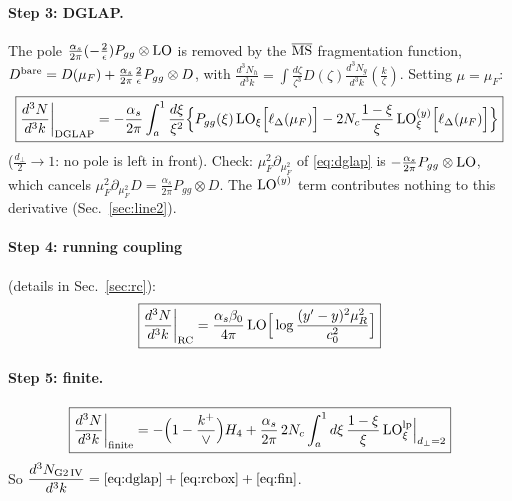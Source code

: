 \documentclass[10pt]{article}
\numberwithin{equation}{section}
\newcommand{\LO}{{\rm LO}}
\newcommand{\MSb}{\overline{\rm MS}}
\begin{document}
\paragraph{Step 3: DGLAP.} The pole $\frac{\alpha_s}{2\pi}(-\frac2\epsilon)P_{gg}\otimes\LO$ is removed by the $\MSb$ fragmentation function, $D^{\rm bare}=D(\mu_F)+\frac{\alpha_s}{2\pi}\frac2\epsilon P_{gg}\otimes D$, with $\frac{d^3N_h}{d^3k}=\int\frac{d\zeta}{\zeta^3}D(\zeta)\frac{d^3N_g}{d^3k}(\frac{k}{\zeta})$. Setting $\mu=\mu_F$:
\begin{equation}
\boxed{\frac{d^3N}{d^3k}\bigg|_{\rm DGLAP}=-\frac{\alpha_s}{2\pi}\int_a^1\frac{d\xi}{\xi^2}\Big\{P_{gg}(\xi)\,\LO_\xi\Big[\ell_\Delta(\mu_F)\Big]-2N_c\frac{1-\xi}{\xi}\,\LO^{(y)}_\xi\Big[\ell_\Delta(\mu_F)\Big]\Big\}}\label{eq:dglap}
\end{equation}
($\frac{d_\perp}{2}\to1$: no pole is left in front). Check: $\mu_F^2\partial_{\mu_F^2}$ of \eqref{eq:dglap} is $-\frac{\alpha_s}{2\pi}P_{gg}\otimes\LO$, which cancels $\mu_F^2\partial_{\mu_F^2}D=\frac{\alpha_s}{2\pi}P_{gg}\otimes D$. The $\LO^{(y)}$ term contributes nothing to this derivative (Sec.~\ref{sec:line2}).

\paragraph{Step 4: running coupling} (details in Sec.~\ref{sec:rc}):
\begin{equation}
\boxed{\frac{d^3N}{d^3k}\bigg|_{\rm RC}=\frac{\alpha_s\beta_0}{4\pi}\,\LO\Big[\log\frac{(y'-y)^2\mu_R^2}{c_0^2}\Big]}\label{eq:rcbox}
\end{equation}

\paragraph{Step 5: finite.}
\begin{equation}
\boxed{\frac{d^3N}{d^3k}\bigg|_{\rm finite}=-\Big(1-\frac{k^+}{\vee}\Big)H_4+\frac{\alpha_s}{2\pi}\,2N_c\int_a^1d\xi\,\frac{1-\xi}{\xi}\,\LO^{\rm lp}_\xi\Big|_{d_\perp=2}}\label{eq:fin}
\end{equation}
So $\displaystyle\frac{d^3N_{\rm G2\,IV}}{d^3k}=\eqref{eq:dglap}+\eqref{eq:rcbox}+\eqref{eq:fin}$.
\end{document}
